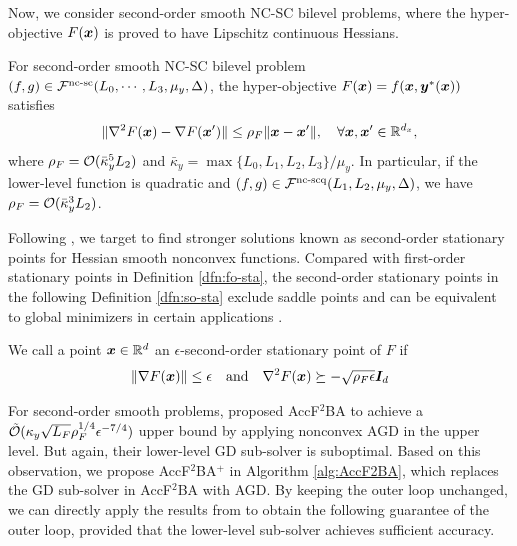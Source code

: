 \documentclass{article}
\begin{document}
Now, we consider second-order smooth NC-SC bilevel problems, where the hyper-objective $F({\bm{x}})$ is proved to have Lipschitz continuous Hessians.


\begin{lem} \label{lem:smooth-phi-second}
For second-order smooth NC-SC bilevel problem $(f,g) \in {\mathcal{F}}^{\text{nc-sc}}(L_0,\cdots,L_3,\mu_y,\Delta)$, the hyper-objective $F({\bm{x}}) = f({\bm{x}},{\bm{y}}^*({\bm{x}}))$ satisfies
\begin{align} \label{eq:hyper-smooth-second}
    \Vert \nabla^2 F({\bm{x}}) - \nabla F({\bm{x}}') \Vert \le \rho_F \Vert {\bm{x}}-  {\bm{x}}' \Vert, \quad \forall {\bm{x}},{\bm{x}}' \in {\mathbb{R}}^{d_x},
\end{align}
where $\rho_F = {\mathcal{O}}( \bar \kappa_y^5 L_2 )$ and $\bar \kappa_y = \max\{L_0,L_1,L_2,L_3 \} / \mu_y$. In particular, if the lower-level function is quadratic and $(f,g) \in {\mathcal{F}}^{\text{nc-scq}}(L_1,L_2,\mu_y, \Delta)$, we have $\rho_F = {\mathcal{O}}(\bar \kappa_y^3 L_2)$.
\end{lem}

Following \citep{nesterov2006cubic}, we target to find stronger solutions known as second-order stationary points for Hessian smooth nonconvex functions. Compared with first-order stationary points in Definition \ref{dfn:fo-sta}, the second-order stationary points in the following Definition \ref{dfn:so-sta} exclude saddle points and can be equivalent to global minimizers in certain applications \citep{ge2015escaping}.

\begin{dfn} \label{dfn:so-sta}
We call 
a point ${\bm{x}} \in {\mathbb{R}}^d$ an $\epsilon$-second-order stationary point of $F$ if 
\begin{align*}
    \Vert \nabla F({\bm{x}}) \Vert \le \epsilon \quad \text{and} \quad \nabla^2 F({\bm{x}}) \succeq -\sqrt{\rho_{F} \epsilon} {\bm{I}}_{d}
\end{align*}
\end{dfn}

For second-order smooth problems, \citet{chen2023near} proposed AccF${}^2$BA to achieve a $\tilde {{\mathcal{O}}}( \kappa_y \sqrt{L_F} \rho_F^{1/4} \epsilon^{-7/4} )$ upper bound by applying nonconvex AGD \citep{carmon2017convex,jin2018accelerated,li2023restarted} in the upper level.
But again, their lower-level GD sub-solver is suboptimal. Based on this observation, we propose 
AccF${}^2$BA${}^+$ in Algorithm \ref{alg:AccF2BA}, which replaces the GD sub-solver in AccF${}^2$BA with AGD.
By keeping the outer loop unchanged, we can directly apply the results from \citep{chen2023near} to obtain the following guarantee of the outer loop, provided that the lower-level sub-solver achieves sufficient accuracy.
\end{document}
